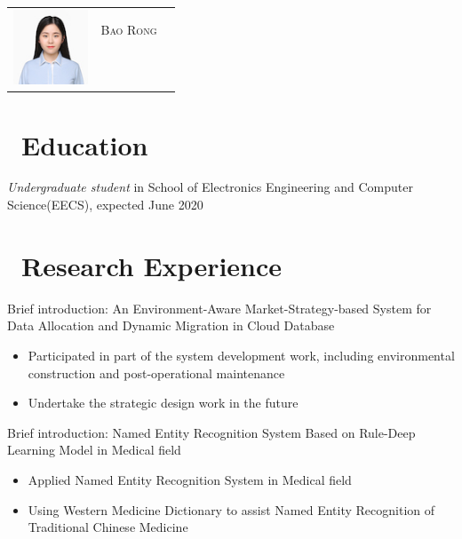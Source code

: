 \documentclass{resume}
\begin{document}

\Large{
  \begin{tabu}{ c l r }
    & \scshape{Bao Rong} \\
    &  \\
    & \\
    \\
    \\
  \end{tabu}
}


\section{\faGraduationCap\ Education}
\textit{Undergraduate student} in School of Electronics Engineering and Computer Science(EECS), expected June 2020


\section{\faUsers\ Research Experience}
Brief introduction:  An Environment-Aware Market-Strategy-based System for Data Allocation and Dynamic Migration in Cloud Database
\begin{itemize}
  \item Participated in part of the system development work, including environmental construction and post-operational maintenance
  \item Undertake the strategic design work in the future
\end{itemize}

Brief introduction: Named Entity Recognition System Based on Rule-Deep Learning Model in Medical field
\begin{itemize}
  \item Applied Named Entity Recognition System in Medical field
  \item Using Western Medicine Dictionary to assist Named Entity Recognition of Traditional Chinese Medicine
\end{itemize}
\end{document}
